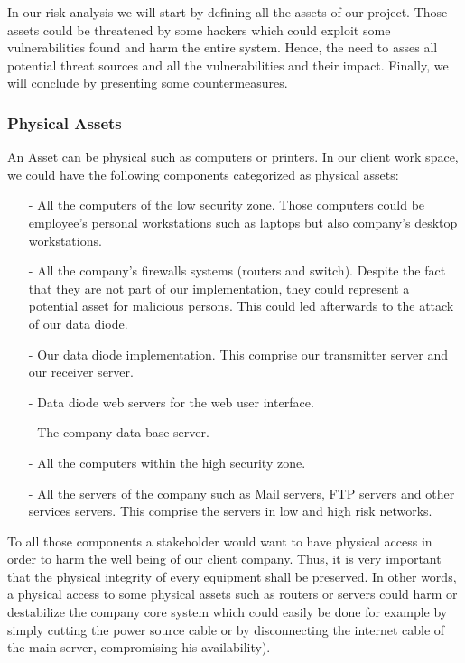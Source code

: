 \documentclass[a4paper,10pt]{article}
\begin{document}
In our risk analysis we will start by defining all the assets of our project. Those assets could be threatened by some hackers which could exploit some vulnerabilities found and harm the entire system. Hence, the need to asses all potential threat sources and all the vulnerabilities and their impact. Finally, we will conclude by presenting some countermeasures.

\subsubsection{Physical Assets}
An Asset can be physical such as computers or printers. In our client work space, we could have the following components categorized as physical assets:
\begin{enumerate}
\item[-] All the computers of the low security zone. Those computers could be employee's personal workstations such as laptops but also company's desktop workstations.
\item[-] All the company's firewalls systems (routers and switch). Despite the fact that they are not part of our implementation, they could represent a potential asset for malicious persons. This could led afterwards to the attack of our data diode.
\item[-] Our data diode implementation. This comprise our transmitter server and our receiver server.
\item[-] Data diode web servers for the web user interface.
\item[-] The company data base server.
\item[-] All the computers within the high security zone.
\item[-] All the servers of the company such as Mail servers, FTP servers and other services servers. This comprise the servers in low and high risk networks.

\end{enumerate}
To all those components a stakeholder would want to have physical access in order to harm the well being of our client company. Thus, it is very important that the physical integrity of every equipment shall be preserved. In other words, a physical access to some physical assets such as routers or servers could harm or destabilize the company core system which could easily be done for example by simply cutting the power source cable or by disconnecting the internet cable of the main server, compromising his availability).
\end{document}
